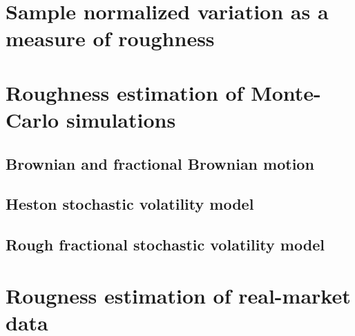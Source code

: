 \section{Sample normalized variation as a measure of roughness}

\section{Roughness estimation of Monte-Carlo simulations}
    \subsection{Brownian and fractional Brownian motion}

    \subsection{Heston stochastic volatility model}

    \subsection{Rough fractional stochastic volatility model}

\section{Rougness estimation of real-market data}
